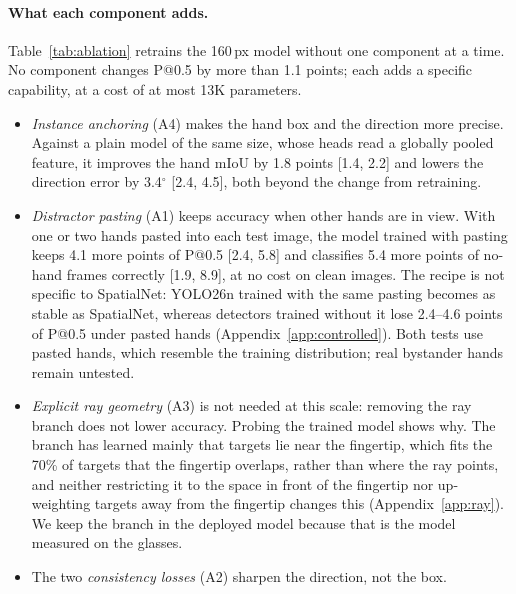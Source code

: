 \paragraph{What each component adds.} Table~\ref{tab:ablation} retrains the 160\,px model without one component at a time. No component changes P@0.5 by more than 1.1 points; each adds a specific capability, at a cost of at most 13K parameters.
\begin{itemize}
\item \emph{Instance anchoring} (A4) makes the hand box and the direction more precise. Against a plain model of the same size, whose heads read a globally pooled feature, it improves the hand mIoU by 1.8 points [1.4, 2.2] and lowers the direction error by 3.4$^\circ$ [2.4, 4.5], both beyond the change from retraining.
\item \emph{Distractor pasting} (A1) keeps accuracy when other hands are in view. With one or two hands pasted into each test image, the model trained with pasting keeps 4.1 more points of P@0.5 [2.4, 5.8] and classifies 5.4 more points of no-hand frames correctly [1.9, 8.9], at no cost on clean images. The recipe is not specific to SpatialNet: YOLO26n trained with the same pasting becomes as stable as SpatialNet, whereas detectors trained without it lose 2.4--4.6 points of P@0.5 under pasted hands (Appendix~\ref{app:controlled}). Both tests use pasted hands, which resemble the training distribution; real bystander hands remain untested.
\item \emph{Explicit ray geometry} (A3) is not needed at this scale: removing the ray branch does not lower accuracy. Probing the trained model shows why. The branch has learned mainly that targets lie near the fingertip, which fits the 70\% of targets that the fingertip overlaps, rather than where the ray points, and neither restricting it to the space in front of the fingertip nor up-weighting targets away from the fingertip changes this (Appendix~\ref{app:ray}). We keep the branch in the deployed model because that is the model measured on the glasses.
\item The two \emph{consistency losses} (A2) sharpen the direction, not the box.
\end{itemize}

